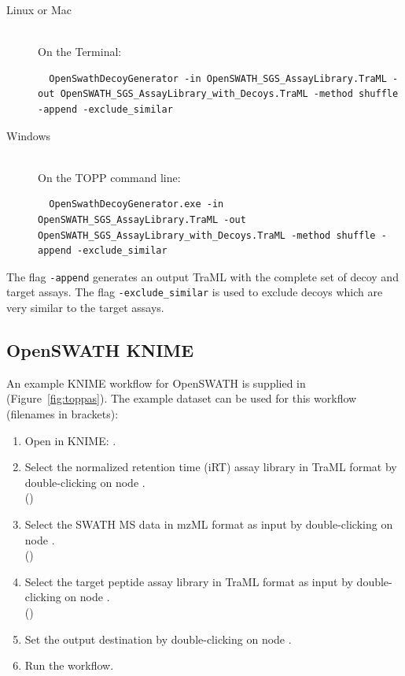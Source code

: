 \begin{description}
  \item[Linux or Mac] \hfill \\
    On the Terminal:
    \begin{lstlisting}
  OpenSwathDecoyGenerator -in OpenSWATH_SGS_AssayLibrary.TraML -out OpenSWATH_SGS_AssayLibrary_with_Decoys.TraML -method shuffle -append -exclude_similar
  \end{lstlisting}
  \item[Windows] \hfill \\
    On the TOPP command line:
    \begin{lstlisting}
  OpenSwathDecoyGenerator.exe -in OpenSWATH_SGS_AssayLibrary.TraML -out OpenSWATH_SGS_AssayLibrary_with_Decoys.TraML -method shuffle -append -exclude_similar
  \end{lstlisting}
\end{description}

The flag \texttt{-append} generates an output TraML with the complete set of decoy and target assays. The flag \texttt{-exclude\_similar} is used to exclude decoys which are very similar to the target assays.  

\subsection{OpenSWATH KNIME}
An example KNIME workflow for OpenSWATH is supplied in  (Figure~\ref{fig:toppas}). The example dataset can be used for this workflow (filenames in brackets):

\begin{enumerate}
  \item Open  in KNIME: .
  \item Select the normalized retention time (iRT) assay library in TraML format by double-clicking on node .\\
  ()
  \item Select the SWATH MS data in mzML format as input by double-clicking on node .\\
  ()
  \item Select the target peptide assay library in TraML format  as input by double-clicking on node .\\
  ()
  \item Set the output destination by double-clicking on node .\\
  \item Run the workflow.
\end{enumerate}

